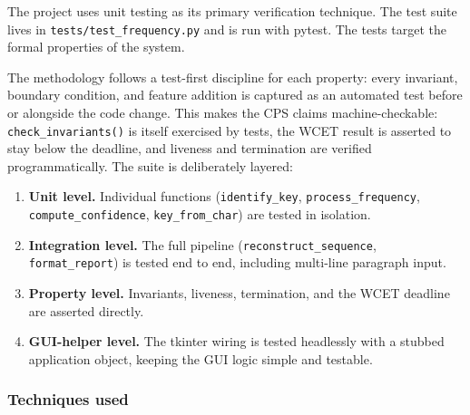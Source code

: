 \documentclass[11pt,a4paper]{article}
\begin{document}
The project uses unit testing as its primary verification technique. The test
suite lives in \texttt{tests/test\_frequency.py} and is run with pytest. The
tests target the formal properties of the system.

The methodology follows a test-first discipline for each property:
every invariant, boundary condition, and feature addition is captured as an
automated test before or alongside the code change. This makes the CPS claims
machine-checkable: \texttt{check\_invariants()} is itself exercised by tests,
the WCET result is asserted to stay below the deadline, and liveness and
termination are verified programmatically. The suite is deliberately layered:

\begin{enumerate}
    \item \textbf{Unit level.} Individual functions
          (\texttt{identify\_}\allowbreak\texttt{key}, \texttt{process\_frequency},
          \texttt{compute\_}\allowbreak\texttt{confidence},
          \texttt{key\_from\_char})
          are tested in isolation.
    \item \textbf{Integration level.} The full pipeline
          (\texttt{reconstruct\_sequence}, \texttt{format\_report}) is tested
          end to end, including multi-line paragraph input.
    \item \textbf{Property level.} Invariants, liveness, termination, and the
          WCET deadline are asserted directly.
    \item \textbf{GUI-helper level.} The tkinter wiring is tested headlessly
          with a stubbed application object, keeping the GUI logic simple and
          testable.
\end{enumerate}

\subsubsection{Techniques used}
\end{document}
